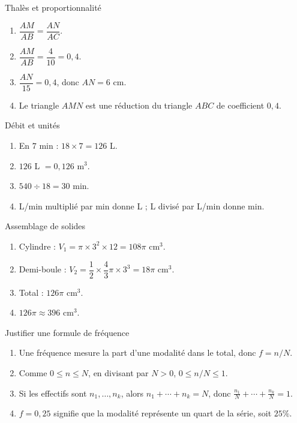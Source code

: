 \documentclass[11pt,a4paper]{article}
\newcounter{corr}
\begin{document}
\begin{corrbox}{Thalès et proportionnalité}
\begin{enumerate}
\item $\dfrac{AM}{AB}=\dfrac{AN}{AC}$.
\item $\dfrac{AM}{AB}=\dfrac4{10}=0{,}4$.
\item $\dfrac{AN}{15}=0{,}4$, donc $AN=6$ cm.
\item Le triangle $AMN$ est une réduction du triangle $ABC$ de coefficient $0{,}4$.
\end{enumerate}
\end{corrbox}

\begin{corrbox}{Débit et unités}
\begin{enumerate}
\item En $7$ min : $18\times7=126$ L.
\item $126$ L $=0{,}126$ m$^3$.
\item $540\div18=30$ min.
\item L/min multiplié par min donne L ; L divisé par L/min donne min.
\end{enumerate}
\end{corrbox}

\begin{corrbox}{Assemblage de solides}
\begin{enumerate}
\item Cylindre : $V_1=\pi\times3^2\times12=108\pi$ cm$^3$.
\item Demi-boule : $V_2=\dfrac12\times\dfrac43\pi\times3^3=18\pi$ cm$^3$.
\item Total : $126\pi$ cm$^3$.
\item $126\pi\approx396$ cm$^3$.
\end{enumerate}
\end{corrbox}

\begin{corrbox}{Justifier une formule de fréquence}
\begin{enumerate}
\item Une fréquence mesure la part d'une modalité dans le total, donc $f=n/N$.
\item Comme $0\leq n\leq N$, en divisant par $N>0$, $0\leq n/N\leq1$.
\item Si les effectifs sont $n_1,\ldots,n_k$, alors $n_1+\cdots+n_k=N$, donc $\frac{n_1}{N}+\cdots+\frac{n_k}{N}=1$.
\item $f=0{,}25$ signifie que la modalité représente un quart de la série, soit $25\%$.
\end{enumerate}
\end{corrbox}
\end{document}
